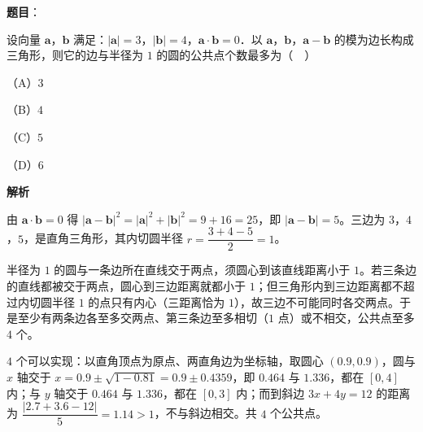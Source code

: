 \begin{answer}

\textbf{题目}：

设向量 $\boldsymbol a$，$\boldsymbol b$ 满足：$|\boldsymbol a|=3$，$|\boldsymbol b|=4$，$\boldsymbol a\cdot\boldsymbol b=0$．以 $\boldsymbol a$，$\boldsymbol b$，$\boldsymbol a-\boldsymbol b$ 的模为边长构成三角形，则它的边与半径为 $1$ 的圆的公共点个数最多为（　）

（A）$3$

（B）$4$

（C）$5$

（D）$6$

\textbf{解析}

由 $\boldsymbol a\cdot\boldsymbol b=0$ 得 $|\boldsymbol a-\boldsymbol b|^2=|\boldsymbol a|^2+|\boldsymbol b|^2=9+16=25$，即 $|\boldsymbol a-\boldsymbol b|=5$。三边为 $3$，$4$，$5$，是直角三角形，其内切圆半径 $r=\dfrac{3+4-5}{2}=1$。

半径为 $1$ 的圆与一条边所在直线交于两点，须圆心到该直线距离小于 $1$。若三条边的直线都被交于两点，圆心到三边距离就都小于 $1$；但三角形内到三边距离都不超过内切圆半径 $1$ 的点只有内心（三距离恰为 $1$），故三边不可能同时各交两点。于是至少有两条边各至多交两点、第三条边至多相切（$1$ 点）或不相交，公共点至多 $4$ 个。

$4$ 个可以实现：以直角顶点为原点、两直角边为坐标轴，取圆心 $(0.9,0.9)$，圆与 $x$ 轴交于 $x=0.9\pm\sqrt{1-0.81}=0.9\pm0.4359$，即 $0.464$ 与 $1.336$，都在 $[0,4]$ 内；与 $y$ 轴交于 $0.464$ 与 $1.336$，都在 $[0,3]$ 内；而到斜边 $3x+4y=12$ 的距离为 $\dfrac{|2.7+3.6-12|}{5}=1.14>1$，不与斜边相交。共 $4$ 个公共点。


\end{answer}
